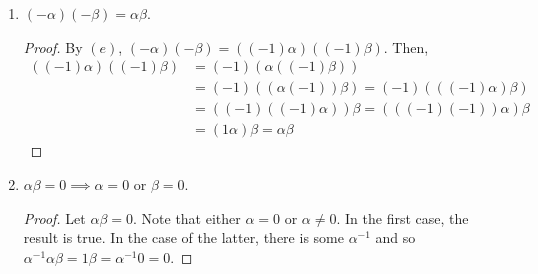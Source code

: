 \documentclass[12pt]{article}
\newenvironment{problem}[2][Problem]{\begin{trivlist} \item[\hskip \labelsep {\bfseries #1}\hskip \labelsep {\bfseries #2.}]}{\end{trivlist}}
\begin{document}
\begin{problem}{1}
\begin{enumerate}
\begin{proof}
\begin{align*}
\end{align*}
By $(b)$, $-\alpha = (-1)\alpha$.
\end{proof}
\item $(-\alpha)(-\beta) = \alpha\beta$.
\begin{proof}
  By $(e)$, $(-\alpha)(-\beta) = ((-1)\alpha)((-1)\beta)$. Then,
\begin{align*}
  ( (-1)\alpha)( (-1)\beta) &= (-1)(\alpha( (-1)\beta))\\
  &= (-1)( (\alpha(-1))\beta) = (-1)( ((-1)\alpha)\beta)\\
  &= ( (-1)( (-1)\alpha))\beta = ( ( (-1)(-1))\alpha)\beta\\
&= (1\alpha)\beta = \alpha\beta
\end{align*}
\end{proof}
\item $\alpha\beta = 0 \implies \alpha = 0 \text{ or }\beta=0$.
\begin{proof}
  Let $\alpha\beta = 0$. Note that either $\alpha = 0$ or $\alpha \neq 0$. In the first case, the result is true. In the case of the latter, there is some $\alpha^{-1}$ and so $\alpha^{-1}\alpha\beta = 1\beta = \alpha^{-1}0 = 0$. 
\end{proof}
\end{enumerate}
\end{problem}
\end{document}
